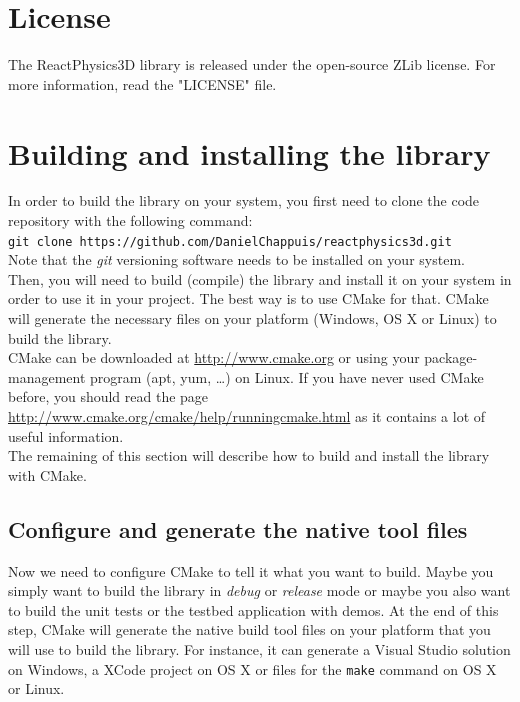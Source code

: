\documentclass[a4paper,12pt]{article}
\begin{document}
    \section{License}

    The ReactPhysics3D library is released under the open-source ZLib license. For more information, read the "LICENSE" file.

    \section{Building and installing the library}
    \label{sec:building}

    In order to build the library on your system, you first need to clone the code repository with the following command: \\

    \texttt{git clone https://github.com/DanielChappuis/reactphysics3d.git} \\

    Note that the \emph{git} versioning software needs to be installed on your system. \\

    Then, you will need to build (compile) the library and install it on your system in order to use it in your project.
    The best way is to use CMake for that. CMake will generate the necessary files on your platform (Windows, OS X or Linux) to build
    the library. \\

    CMake can be downloaded at \url{http://www.cmake.org} or using your package-management program (apt, yum, \dots) on Linux.
    If you have never used CMake before, you should read the page \url{http://www.cmake.org/cmake/help/runningcmake.html} as
    it contains a lot of useful information. \\

    The remaining of this section will describe how to build and install the library with CMake. \\

    \subsection{Configure and generate the native tool files}

    Now we need to configure CMake to tell it what you want to build. Maybe you simply want to build the library in \emph{debug} or \emph{release}
    mode or maybe you also want to build the unit tests or the testbed application with demos. At the end of this step, CMake will generate the
    native build tool files on your platform that you will use to build the library. For instance, it can generate a Visual Studio solution on Windows,
    a XCode project on OS X or files for the \texttt{make} command on OS X or Linux.
\end{document}

